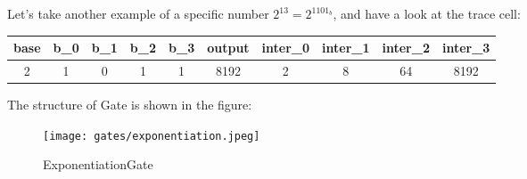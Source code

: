 Let's take another example of a specific number $2^13 = 2^{1101_b}$, and have a look at the trace cell:
\begin{center}
    \begin{tabular}{ |c|c|c|c|c|c|c|c|c|c| }
        \hline
        base & b\_0 & b\_1 & b\_2 & b\_3 & output & inter\_0 & inter\_1 & inter\_2 & inter\_3 \\
        \hline
        2 & 1 & 0 & 1 & 1 & 8192 & 2 & 8 & 64 & 8192 \\
        \hline
    \end{tabular}
\end{center}

The structure of Gate is shown in the figure:
\begin{figure}[!ht]
    \centering
    \texttt{[image: gates/exponentiation.jpeg]}
    \caption{ExponentiationGate}
    \label{fig:exponetiation-gate}
\end{figure}